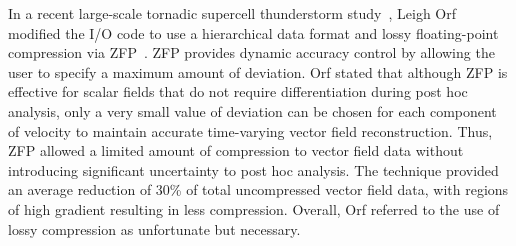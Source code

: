 In a recent large-scale tornadic supercell thunderstorm study~\cite{atmos10100578}, Leigh Orf modified the I/O code to use a hierarchical data format and lossy floating-point compression via ZFP~\cite{lindstrom2006fast}.
%
ZFP provides dynamic accuracy control by allowing the user to specify a maximum amount of deviation.
%
Orf stated that although ZFP is effective for scalar fields that do not require differentiation during post hoc analysis, only a very small value of deviation can be chosen for each component of velocity to maintain accurate time-varying vector field reconstruction. 
%
Thus, ZFP allowed a limited amount of compression to vector field data without introducing significant uncertainty to post hoc analysis. 
%
The technique provided an average reduction of 30\% of total uncompressed vector field data, with regions of high gradient resulting in less compression. 
%
Overall, Orf referred to the use of lossy compression as unfortunate but necessary.
